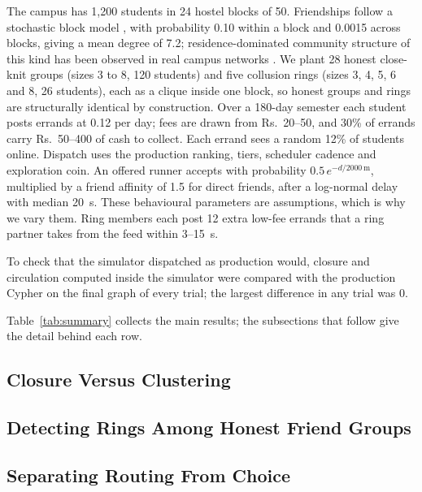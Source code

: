 \documentclass[journal]{IEEEtran}
\begin{document}
The campus has 1,200 students in 24 hostel blocks of 50. Friendships follow a
stochastic block model \cite{holland1983stochastic}, with probability 0.10 within a
block and 0.0015 across blocks, giving a mean degree of 7.2; residence-dominated
community structure of this kind has been observed in real campus networks
\cite{traud2012social}. We plant 28 honest close-knit groups (sizes 3 to 8, 120
students) and five collusion rings (sizes 3, 4, 5, 6 and 8, 26 students), each as a
clique inside one block, so honest groups and rings are structurally identical by
construction. Over a 180-day semester each student posts errands at 0.12 per day;
fees are drawn from Rs.~20--50, and 30\% of errands carry Rs.~50--400 of cash to
collect. Each errand sees a random 12\% of students online. Dispatch uses the
production ranking, tiers, scheduler cadence and exploration coin. An offered runner
accepts with probability $0.5\,e^{-d/2000\,\mathrm{m}}$, multiplied by a friend
affinity of 1.5 for direct friends, after a log-normal delay with median 20~s. These
behavioural parameters are assumptions, which is why we vary them. Ring members each
post 12 extra low-fee errands that a ring partner takes from the feed within
3--15~s.

To check that the simulator dispatched as production would, closure and circulation
computed inside the simulator were compared with the production Cypher on the final
graph of every trial; the largest difference in any trial was 0.

Table~\ref{tab:summary} collects the main results; the subsections that follow give
the detail behind each row.



\subsection{Closure Versus Clustering}\label{sec:eval-closure}


\subsection{Detecting Rings Among Honest Friend Groups}\label{sec:eval-rings}


\subsection{Separating Routing From Choice}\label{sec:eval-policy}

\end{document}
